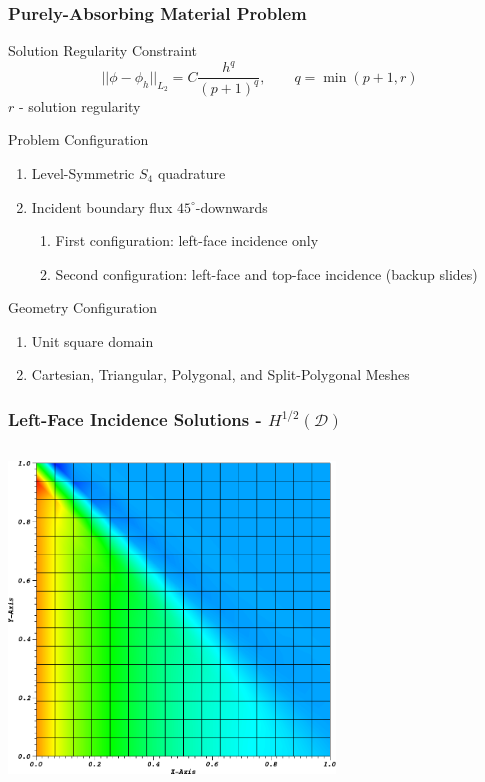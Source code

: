 \documentclass[compress,10pt]{beamer}
\begin{document}
\begin{frame}[t]
{
\frametitle{Purely-Absorbing Material Problem}
\begin{block}{Solution Regularity Constraint}
\begin{equation*}
||\phi - \phi_h||_{L_2} = C\frac{h^q}{(p+1)^{q}}, \qquad q = \min (p+1, r)
\end{equation*}
$r$ - solution regularity
\end{block}
\begin{block}{Problem Configuration}
\begin{enumerate}
\item Level-Symmetric $S_4$ quadrature
\item Incident boundary flux $45^{\circ}$-downwards
	\begin{enumerate}
	\item First configuration: left-face incidence only
	\item Second configuration: left-face and top-face incidence (backup slides)
	\end{enumerate}
\end{enumerate}
\end{block}
\begin{block}{Geometry Configuration}
\begin{enumerate}
\item Unit square domain
\item Cartesian, Triangular, Polygonal, and Split-Polygonal Meshes
\end{enumerate}
\end{block}
}
{
\frametitle{Left-Face Incidence Solutions - $H^{1/2} (\mathcal{D})$}
\begin{columns}
\centering
{}\includegraphics[width=0.65\textwidth]{images/PALeftSol_Cart.png} \\

\end{columns}}
\end{frame}
\end{document}
